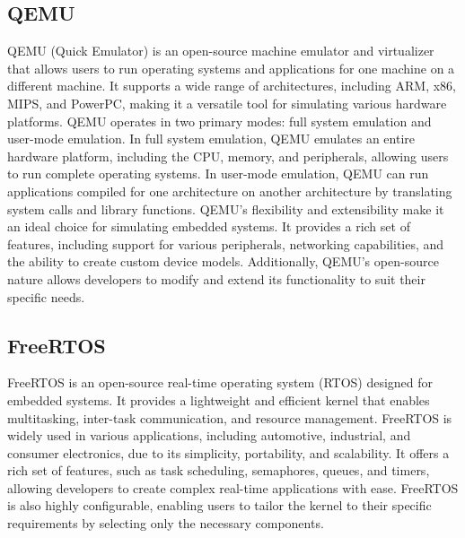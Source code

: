 \subsection{QEMU}

QEMU (Quick Emulator) is an open-source machine emulator and virtualizer that allows users to run operating systems and applications for one machine on a different machine. It supports a wide range of architectures, including ARM, x86, MIPS, and PowerPC, making it a versatile tool for simulating various hardware platforms.
QEMU operates in two primary modes: full system emulation and user-mode emulation. In full system emulation, QEMU emulates an entire hardware platform, including the CPU, memory, and peripherals, allowing users to run complete operating systems. In user-mode emulation, QEMU can run applications compiled for one architecture on another architecture by translating system calls and library functions.
QEMU's flexibility and extensibility make it an ideal choice for simulating embedded systems. It provides a rich set of features, including support for various peripherals, networking capabilities, and the ability to create custom device models. Additionally, QEMU's open-source nature allows developers to modify and extend its functionality to suit their specific needs.

\subsection{FreeRTOS}
FreeRTOS is an open-source real-time operating system (RTOS) designed for embedded systems. It provides a lightweight and efficient kernel that enables multitasking, inter-task communication, and resource management. FreeRTOS is widely used in various applications, including automotive, industrial, and consumer electronics, due to its simplicity, portability, and scalability.
It offers a rich set of features, such as task scheduling, semaphores, queues, and timers, allowing developers to create complex real-time applications with ease. FreeRTOS is also highly configurable, enabling users to tailor the kernel to their specific requirements by selecting only the necessary components.


